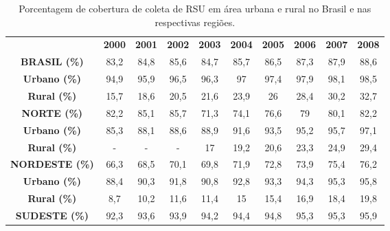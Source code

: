 \begin{table}[phtb!]
		\centering
		\caption{Porcentagem de cobertura de coleta de RSU em área urbana e rural no Brasil e nas respectivas regiões.}
		\label{tab:cobertura_rsu}
		\begin{tabular}{cccccccccc}
			\textbf{}                  & \textbf{2000} & \textbf{2001} & \textbf{2002} & \textbf{2003} & \textbf{2004} & \textbf{2005} & \textbf{2006} & \textbf{2007} & \textbf{2008} \\
			\textbf{BRASIL (\%)}       & 83,2          & 84,8          & 85,6          & 84,7          & 85,7          & 86,5          & 87,3          & 87,9          & 88,6          \\
			\textbf{Urbano (\%)}       & 94,9          & 95,9          & 96,5          & 96,3          & 97            & 97,4          & 97,9          & 98,1          & 98,5          \\
			\textbf{Rural (\%)}        & 15,7          & 18,6          & 20,5          & 21,6          & 23,9          & 26            & 28,4          & 30,2          & 32,7          \\
			\textbf{NORTE (\%)}        & 82,2          & 85,1          & 85,7          & 71,3          & 74,1          & 76,6          & 79            & 80,1          & 82,2          \\
			\textbf{Urbano (\%)}       & 85,3          & 88,1          & 88,6          & 88,9          & 91,6          & 93,5          & 95,2          & 95,7          & 97,1          \\
			\textbf{Rural (\%)}        & -             & -             & -             & 17            & 19,2          & 20,6          & 23,3          & 24,9          & 29,4          \\
			\textbf{NORDESTE  (\%)}    & 66,3          & 68,5          & 70,1          & 69,8          & 71,9          & 72,8          & 73,9          & 75,4          & 76,2          \\
			\textbf{Urbano (\%)}       & 88,4          & 90,3          & 91,8          & 90,8          & 92,8          & 93,3          & 94,3          & 95,3          & 95,8          \\
			\textbf{Rural (\%)}        & 8,7           & 10,2          & 11,6          & 11,4          & 15            & 15,4          & 16,9          & 18,4          & 19,8          \\
			\textbf{SUDESTE (\%)}      & 92,3          & 93,6          & 93,9          & 94,2          & 94,4          & 94,8          & 95,3          & 95,3          & 95,9          \\

\end{tabular}
\end{table}
